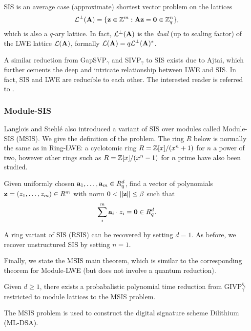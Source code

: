 SIS is an average case (approximate) shortest vector problem on the lattices
\begin{align}\label{eq:q-array-lattice}
    \mathcal{L}^\bot(\mathbf{A}) = \{ \mathbf{z} \in \mathbb{Z}^m : \mathbf{A} \mathbf{z} = \mathbf{0} \in \mathbb{Z}_q^{n} \},
\end{align}
which is also a $q$-ary lattice. In fact, $\mathcal{L}^\bot(\mathbf{A})$ is the \textit{dual} (up to scaling factor) of the LWE lattice $\mathcal{L}(\mathbf{A})$, formally $\mathcal{L}(\mathbf{A}) = q \mathcal{L}^\bot(\mathbf{A})^*$.

A similar reduction from GapSVP$_\gamma$ and SIVP$_\gamma$ to SIS exists due to Ajtai, which further cements the deep and intricate relationship between LWE and SIS. In fact, SIS and LWE are reducible to each other. The interested reader is referred to \cite{peikert_dec,cryptoeprint:2021/1358,ajt96}.

\subsubsection{Module-SIS}
Langlois and Stehlé \cite{ls15} also introduced a variant of SIS over modules called Module-SIS (MSIS). We give the definition of the problem. The ring $R$ below is normally the same as in Ring-LWE: a cyclotomic ring $R = \mathbb{Z} [x] / (x^n + 1)$ for $n$ a power of two, however other rings such as $R = \mathbb{Z} [x] /(x^n -1)$ for $n$ prime have also been studied.

\begin{definition}
    Given uniformly chosen $\mathbf{a}_1, \ldots, \mathbf{a}_m \in R_q^d$, find a vector of polynomials $\mathbf{z} = (z_1, \ldots, z_m) \in R^m$ with norm $0 < || \mathbf{z} || \leq \beta$ such that \[ \sum_i^m \mathbf{a}_i \cdot z_i  = \mathbf{0} \in R_q^d. \]
\end{definition}

A ring variant of SIS (RSIS) can be recovered by setting $d = 1$. As before, we recover unstructured SIS by setting $n = 1$. 

Finally, we state the MSIS main theorem, which is similar to the corresponding theorem for Module-LWE (but does not involve a quantum reduction).
\begin{theorem}
    Given $d \geq 1$, there exists a probabalistic polynomial time reduction from GIVP$_\gamma^{\eta_\epsilon}$ restricted to module lattices to the MSIS problem.
\end{theorem}
The MSIS problem is used to construct the digital signature scheme Dilithium (ML-DSA).